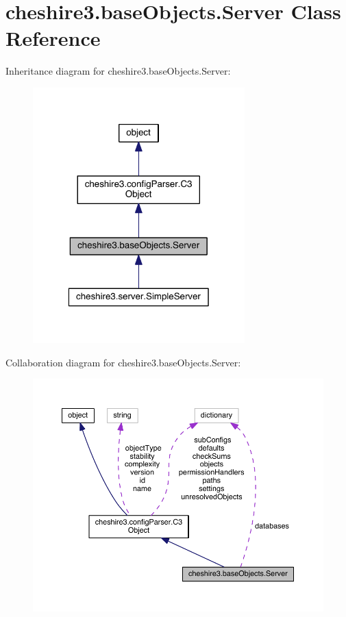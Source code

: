 \hypertarget{classcheshire3_1_1base_objects_1_1_server}{\section{cheshire3.\-base\-Objects.\-Server Class Reference}
\label{classcheshire3_1_1base_objects_1_1_server}
}


Inheritance diagram for cheshire3.\-base\-Objects.\-Server\-:
\nopagebreak
\begin{figure}[H]
\begin{center}
\leavevmode
\includegraphics[width=232pt]{classcheshire3_1_1base_objects_1_1_server__inherit__graph}
\end{center}
\end{figure}


Collaboration diagram for cheshire3.\-base\-Objects.\-Server\-:
\nopagebreak
\begin{figure}[H]
\begin{center}
\leavevmode
\includegraphics[width=350pt]{classcheshire3_1_1base_objects_1_1_server__coll__graph}
\end{center}
\end{figure}
